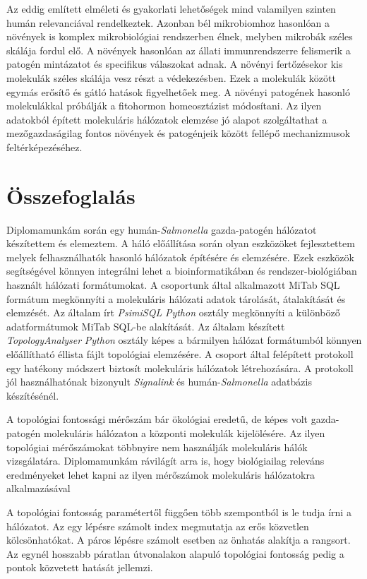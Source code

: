 \documentclass[a4paper,12pt]{article}
\begin{document}
		Az eddig említett elméleti és gyakorlati lehetőségek mind valamilyen szinten humán relevanciával rendelkeztek. Azonban bél mikrobiomhoz hasonlóan a növények is komplex mikrobiológiai rendszerben élnek, melyben mikrobák széles skálája fordul elő. 
		A növények hasonlóan az állati immunrendszerre felismerik a patogén mintázatot és specifikus válaszokat adnak. A növényi fertőzésekor kis molekulák széles skálája vesz részt a védekezésben. Ezek a molekulák között egymás erősítő és gátló hatások figyelhetőek meg. A növényi patogének hasonló molekulákkal próbálják a fitohormon homeosztázist módosítani. \cite{discussion_plant_network} Az ilyen adatokból épített molekuláris hálózatok elemzése jó alapot szolgáltathat a mezőgazdaságilag fontos növények és patogénjeik között fellépő mechanizmusok feltérképezéséhez.
		
		\pagebreak

\section{Összefoglalás}
		
		Diplomamunkám során egy humán-\textit{Salmonella} gazda-patogén hálózatot készítettem és elemeztem. A háló előállítása során olyan eszközöket fejlesztettem melyek felhasználhatók hasonló hálózatok építésére és elemzésére. Ezek eszközök segítségével könnyen integrálni lehet a bioinformatikában és rendszer-biológiában használt hálózati formátumokat. A csoportunk által alkalmazott MiTab SQL formátum megkönnyíti a molekuláris hálózati adatok tárolását, átalakítását és elemzését. Az általam írt \textit{PsimiSQL} \textit{Python} osztály megkönnyíti a különböző adatformátumok MiTab SQL-be alakítását. Az általam készített \textit{TopologyAnalyser} \textit{Python} osztály képes a  bármilyen hálózat formátumból könnyen előállítható éllista fájlt topológiai elemzésére.  A csoport által felépített protokoll egy hatékony módszert biztosít molekuláris hálózatok létrehozására. A protokoll jól használhatónak bizonyult \textit{Signalink} és humán-\textit{Salmonella} adatbázis készítésénél.
		
		A topológiai fontossági mérőszám bár ökológiai eredetű, de képes volt gazda-patogén molekuláris hálózaton a központi molekulák kijelölésére. Az ilyen topológiai mérőszámokat többnyire nem használják molekuláris hálók vizsgálatára. Diplomamunkám rávilágít arra is, hogy biológiailag releváns eredményeket lehet kapni az ilyen mérőszámok molekuláris hálózatokra alkalmazásával
		
		A topológiai fontosság paramétertől függően több szempontból is le tudja írni a hálózatot. Az egy lépésre számolt index megmutatja az erős közvetlen kölcsönhatókat. A páros lépésre számolt esetben az önhatás alakítja a rangsort. Az egynél hosszabb páratlan útvonalakon alapuló topológiai fontosság pedig a pontok közvetett hatását jellemzi.
		
\end{document}

